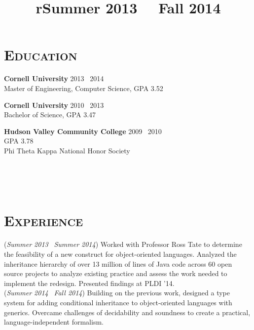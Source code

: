 \begin{resume}


\section{\textsc{Education}}

\textbf{Cornell University} \hfill 2013 \textendash\ 2014 \\
Master of Engineering, Computer Science, GPA 3.52

\textbf{Cornell University} \hfill 2010 \textendash\ 2013\\
Bachelor of Science, GPA 3.47%

\textbf{Hudson Valley Community College} \hfill 2009 \textendash\ 2010 \\ 
GPA 3.78\\
Phi Theta Kappa National Honor Society


\begin{formatb}
  \title{r}\\
  \\
  \body\\
\end{formatb}

\vfill

\section{\textsc{Experience}}

\title{Summer 2013 \textendash\ \ Fall 2014}
\location{}
\begin{position}
(\emph{Summer 2013} \textendash\ \emph{Summer 2014})  Worked with Professor Ross Tate to determine the feasibility of a new construct for object-oriented languages.
Analyzed the inheritance hierarchy of over 13 million of lines of Java code across 60 open source projects to analyze existing practice and assess the work needed to implement the redesign.
Presented findings at PLDI '14.
\\
(\emph{Summer 2014} \textendash\ \emph{Fall 2014})  Building on the previous work, designed a type system for adding conditional inheritance to object-oriented languages with generics.
Overcame challenges of decidability and soundness to create a practical, language-independent formalism.
\end{position}


\end{resume}
